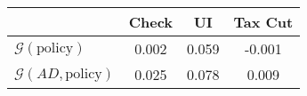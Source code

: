 \begin{tabular}{@{}lccc@{}}
\toprule
                          & Check      & UI    & Tax Cut    \\  \midrule
$\mathcal{G}(\text{policy})$ & 0.002  & 0.059  & -0.001     \\
$\mathcal{G}(AD,\text{policy})$ & 0.025  & 0.078  & 0.009     \\
\end{tabular}
